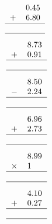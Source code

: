 \documentclass[leqno, 12pt]{article}
\begin{document}
\begin{multicols}{3}
\begin{equation}
{\begin{tabular}{c S[table-format=1.2]}
         &0.45 \tabularnewline
        $+$&6.80 \tabularnewline
        \hline
         & \tabularnewline
        \hline
    \end{tabular}}
\end{equation}
\vspace{-1pt}%
\begin{equation}
    \raisebox{-0.8cm}{
        \begin{tabular}{c S[table-format=1.2]}
         &8.73 \tabularnewline
        $+$&0.91 \tabularnewline
        \hline
         & \tabularnewline
        \hline
    \end{tabular}}
\end{equation}
\vspace{-1pt}%
\begin{equation}
    \raisebox{-0.8cm}{
        \begin{tabular}{c S[table-format=1.2]}
         &8.50 \tabularnewline
        $-$&2.24 \tabularnewline
        \hline
         & \tabularnewline
        \hline
    \end{tabular}}
\end{equation}
\vspace{-1pt}%
\begin{equation}
    \raisebox{-0.8cm}{
        \begin{tabular}{c S[table-format=1.2]}
         &6.96 \tabularnewline
        $+$&2.73 \tabularnewline
        \hline
         & \tabularnewline
        \hline
    \end{tabular}}
\end{equation}
\vspace{-1pt}%
\begin{equation}
    \raisebox{-0.8cm}{
        \begin{tabular}{c S[table-format=1.2]}
         &8.99 \tabularnewline
        $\times$&1 \tabularnewline
        \hline
         & \tabularnewline
        \hline
    \end{tabular}}
\end{equation}
\vspace{-1pt}%
\begin{equation}
    \raisebox{-0.8cm}{
        \begin{tabular}{c S[table-format=1.2]}
         &4.10 \tabularnewline
        $+$&0.27 \tabularnewline
        \hline
         & \tabularnewline
        \hline
    \end{tabular}}
\end{equation}

\end{multicols}
\end{document}
